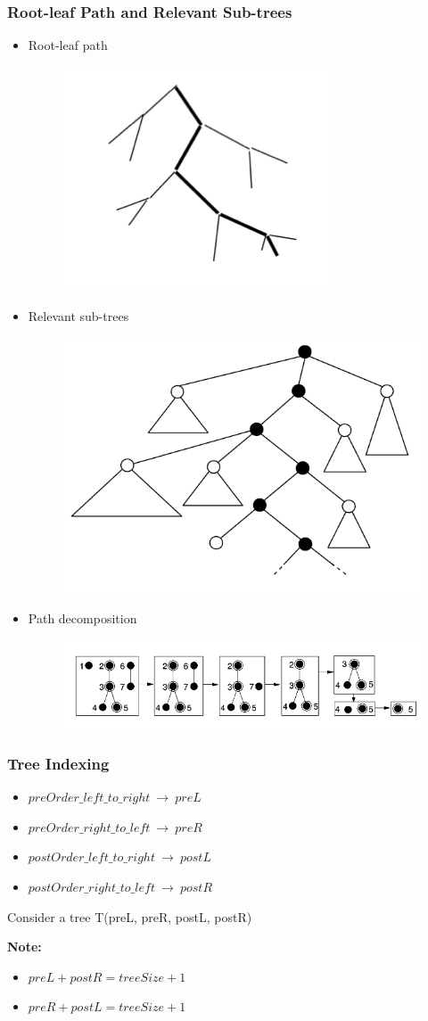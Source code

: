 \documentclass{beamer}
\begin{document}
\begin{frame}
\frametitle{Root-leaf Path and Relevant Sub-trees}
\begin{itemize}
\item Root-leaf path
\begin{figure}
	\includegraphics[width=0.2\linewidth]{RootLeafPath}
	\centering
\end{figure}
\item Relevant sub-trees
\begin{figure}
	\includegraphics[width=0.3\linewidth]{RelevantSubtrees}
	\centering
\end{figure}
\item Path decomposition
\begin{figure}
	\includegraphics[width=0.6\linewidth]{KleinAlgorithmExample}
	\centering
\end{figure}
\end{itemize}
\end{frame}
\begin{frame}
\frametitle{Tree Indexing}
\begin{itemize}
\item $preOrder\_left\_to\_right\ \to\ preL\ $
\item $preOrder\_right\_to\_left\ \to\ preR\ $
\item $postOrder\_left\_to\_right\ \to\ postL\ $
\item $postOrder\_right\_to\_left\ \to\ postR\ $
\end{itemize}
Consider a tree T(preL, preR, postL, postR)

\begingroup

\centering
{}

\endgroup
\textbf{Note:}
\begin{itemize}
\item $preL + postR= treeSize + 1$
\item $preR + postL= treeSize + 1$
\end{itemize}
\end{frame}
\end{document}

